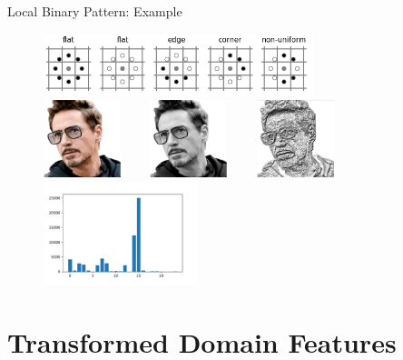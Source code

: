 \begin{frame}{Local Binary Pattern: Example}
\begin{figure}
\centering
\includegraphics[width=0.7\textwidth]{Figures/LBP003.png}\\\vspace{0.2cm}
\includegraphics[width=0.2\textwidth]{Figures/tonyStark.jpg}~~~~
\includegraphics[width=0.2\textwidth]{Figures/TonyStarkGray.jpg}~~~~
\includegraphics[width=0.2\textwidth]{Figures/TonyStarkLBP.jpg}\\
\includegraphics[width=0.4\textwidth]{Figures/tonyStarkBar}
\end{figure}
\end{frame}

\section[TD Features]{Transformed Domain Features}
\subsection{}

